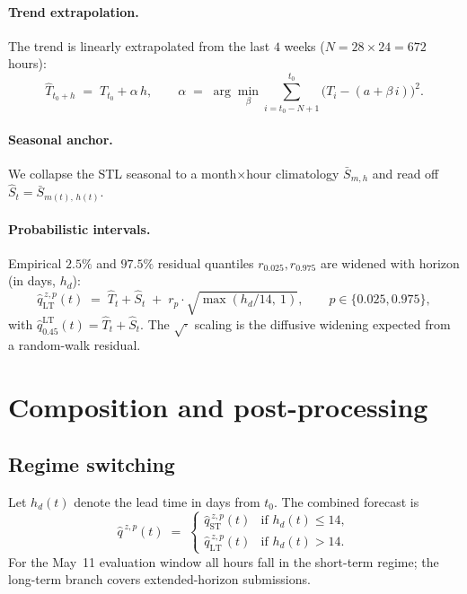 \documentclass[11pt,a4paper]{article}
\begin{document}
\paragraph{Trend extrapolation.}
The trend is linearly extrapolated from the last $4$ weeks
($N = 28 \times 24 = 672$ hours):
\begin{equation}
  \hat{T}_{t_0+h} \;=\; T_{t_0} + \alpha\, h,
  \qquad
  \alpha \;=\; \arg\min_{\beta}
  \sum_{i=t_0-N+1}^{t_0} \bigl(T_i - (a + \beta \, i)\bigr)^2.
\end{equation}

\paragraph{Seasonal anchor.}
We collapse the STL seasonal to a month$\times$hour climatology
$\bar{S}_{m,h}$ and read off
$\hat{S}_{t} = \bar{S}_{m(t),\,h(t)}$.

\paragraph{Probabilistic intervals.}
Empirical $2.5\%$ and $97.5\%$ residual quantiles $r_{0.025}, r_{0.975}$
are widened with horizon (in days, $h_d$):
\begin{equation}
  \hat{q}^{\,z,p}_{\mathrm{LT}}(t)
  \;=\; \hat{T}_{t} + \hat{S}_t \;+\; r_p \cdot
  \sqrt{\max(h_d/14,\ 1)},
  \qquad p \in \{0.025, 0.975\},
\end{equation}
with $\hat{q}_{0.45}^{\mathrm{LT}}(t) = \hat{T}_t + \hat{S}_t$. The
$\sqrt{\cdot}$ scaling is the diffusive widening expected from a random-walk
residual.

\section{Composition and post-processing}

\subsection{Regime switching}

Let $h_d(t)$ denote the lead time in days from $t_0$. The combined
forecast is
\begin{equation}
  \hat{q}^{\,z,p}(t) \;=\;
  \begin{cases}
    \hat{q}^{\,z,p}_{\mathrm{ST}}(t) & \text{if } h_d(t) \le 14, \\
    \hat{q}^{\,z,p}_{\mathrm{LT}}(t) & \text{if } h_d(t) > 14.
  \end{cases}
\end{equation}
For the May~11 evaluation window all hours fall in the short-term
regime; the long-term branch covers extended-horizon submissions.
\end{document}
